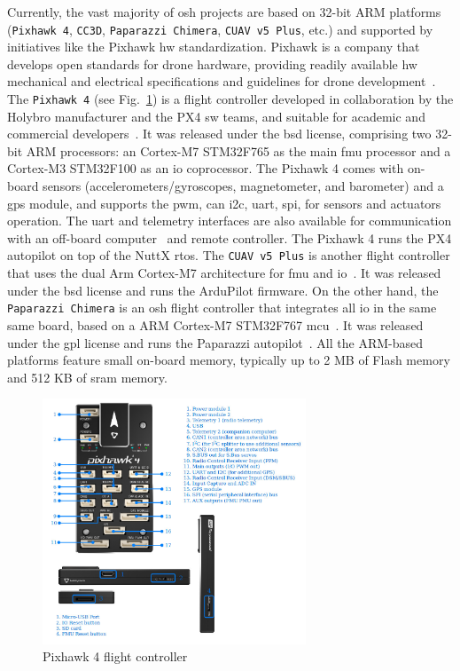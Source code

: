 Currently, the vast majority of \gls{osh} projects are based on 32-bit ARM platforms
(\lstinline{Pixhawk 4}, \lstinline{CC3D}, \lstinline{Paparazzi Chimera},
\lstinline{CUAV v5 Plus}, etc.) and supported by initiatives
like the Pixhawk \gls{hw} standardization. Pixhawk is a company that develops open
standards for drone hardware, providing readily available \gls{hw}
mechanical and electrical specifications and guidelines for drone development~\cite{pixhawk}.
%
The \lstinline{Pixhawk 4} (see Fig.~\ref{fig:osh-pixhawk4}) is a flight
controller developed in collaboration by the Holybro manufacturer and the PX4
\gls{sw} teams, and suitable for academic and commercial developers~\cite{pixhawk4}.
It was released under the \gls{bsd} license, comprising two 32-bit ARM
processors: an Cortex-M7 STM32F765 as the main \gls{fmu} processor and a
Cortex-M3 STM32F100 as an \gls{io} coprocessor. The Pixhawk 4 comes with
on-board sensors (accelerometers/gyroscopes, magnetometer, and barometer) and a
\gls{gps} module, and supports the \gls{pwm}, \gls{can} \gls{i2c}, \gls{uart},
\gls{spi}, for sensors and actuators operation. The \gls{uart} and telemetry
interfaces are also available for communication with an off-board
computer~\cite{pixhawk4} and remote controller. The Pixhawk 4 runs the PX4
autopilot on top of the NuttX \gls{rtos}.
%
The \lstinline{CUAV v5 Plus} is another flight controller that uses the dual Arm
Cortex-M7 architecture for \gls{fmu} and \gls{io}~\cite{arduPilot-cuavV5}. It
was released under the \gls{bsd} license and runs the ArduPilot
firmware. On the other hand, the \lstinline{Paparazzi Chimera} is an \gls{osh}
flight controller that integrates all \gls{io} in the same same board, based on
a ARM Cortex-M7 STM32F767 \gls{mcu}~\cite{paparazziChimera}. It was released
under the \gls{gpl} license and runs the Paparazzi
autopilot~\cite{paparazzi-github}. All the ARM-based platforms feature small
on-board memory, typically up to 2 MB of Flash memory and 512 KB of \gls{sram} memory.
  
\begin{figure}[!hbt]
  \centering
  \includegraphics[width=0.7\textwidth]{./img/jpg/osh-pixhawk4.jpg} 
  \caption[Pixhawk4 flight controller]{Pixhawk 4 flight controller~\cite{pixhawk4}\footnotemark}%
  \label{fig:osh-pixhawk4}
\end{figure}

